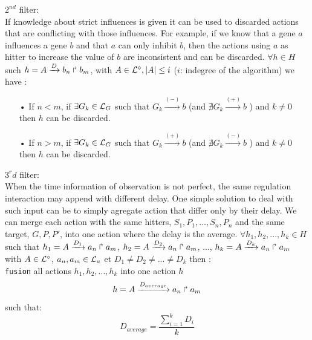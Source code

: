 $2^{nd}$ filter: \\

If knowledge about strict influences is given it can be used to discarded actions that are conflicting with those influences.
For example, if we know that a gene $a$ influences a gene $b$ and that $a$ can only inhibit $b$, then the actions using $a$ as hitter to increase the value of $b$ are inconsistent and can be discarded.
$\forall h \in H$ such $h=A\xrightarrow{D} b_n \Rsh b_m$, with $ A \in \mathcal{L}^{\diamond}, | A| \leq i$ ($i$: indegree of the algorithm) we have :

\begin{itemize}
\item[•] If $n < m$, if $\exists G_k \in \mathcal{L}_G $ such that $G_k \xrightarrow{(-)} b$ (and $\nexists G_k \xrightarrow{(+)} b$ ) and $k \neq 0$ then $h$ can be discarded.
\item[•] If $n > m$, if $\exists G_k \in \mathcal{L}_G $ such that $G_k \xrightarrow{(+)} b$ (and $\nexists G_k \xrightarrow{(-)} b$ ) and $k \neq 0$ then $h$ can be discarded.
\end{itemize} 

$3^rd$ filter:\\

When the time information of observation is not perfect, the same regulation interaction may append with different delay.
One simple solution to deal with such input can be to simply agregate action that differ only by their delay.
We can merge each action with the same hitters, $S_1,P_1,\ldots, S_n,P_n$ and the same target, $G, P, P'$, into one action where the delay is the average.
$\forall h_1, h_2,..., h_k \in H$ such that $h_1=A\xrightarrow{D_1} a_n \Rsh a_m$, $h_2=A\xrightarrow{D_2} a_n \Rsh a_m$, ..., $h_k=A\xrightarrow{D_k} a_n \Rsh a_m$ with $ A \in \mathcal{L}^{\diamond}$, $a_n, a_m \in \mathcal{L}_a$ et $D_1 \neq D_2 \neq ... \neq D_k$ then : \\
\texttt{fusion} all actions $h_1, h_2,..., h_k$ into one action $h$ $$h=A\xrightarrow{D_{average}} a_n \Rsh a_m$$ such that: 
$$D_{average} = \frac{\sum_{i=1}^k D_{i}}{k} $$
